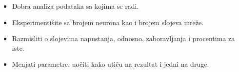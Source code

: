\documentclass[a4paper]{article}
\begin{document}
\begin{itemize}
    \item Dobra analiza podataka sa kojima se radi.
    \item Eksperimentišite sa brojem neurona kao i brojem slojeva mreže.
    \item Razmisliti o slojevima napustanja, odnosno, zaboravljanja i procentima za iste.
    \item Menjati parametre, uočiti kako utiču na rezultat i jedni na druge.
\end{itemize}

\label{sec:zakljucak}




\appendix
 

\end{document}
